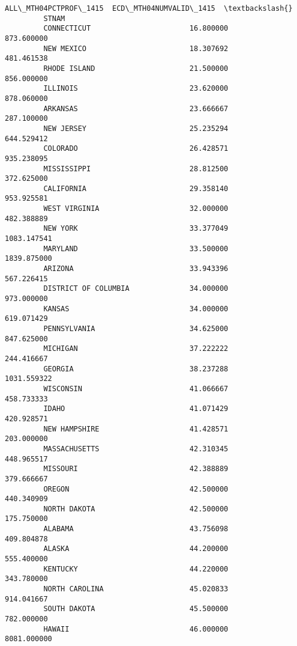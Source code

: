 \documentclass[11pt]{article}
\begin{document}
\begin{Verbatim}[commandchars=\\\{\}]
                               ALL\_MTH04PCTPROF\_1415  ECD\_MTH04NUMVALID\_1415  \textbackslash{}
         STNAM                                                                 
         CONNECTICUT                       16.800000              873.600000   
         NEW MEXICO                        18.307692              481.461538   
         RHODE ISLAND                      21.500000              856.000000   
         ILLINOIS                          23.620000              878.060000   
         ARKANSAS                          23.666667              287.100000   
         NEW JERSEY                        25.235294              644.529412   
         COLORADO                          26.428571              935.238095   
         MISSISSIPPI                       28.812500              372.625000   
         CALIFORNIA                        29.358140              953.925581   
         WEST VIRGINIA                     32.000000              482.388889   
         NEW YORK                          33.377049             1083.147541   
         MARYLAND                          33.500000             1839.875000   
         ARIZONA                           33.943396              567.226415   
         DISTRICT OF COLUMBIA              34.000000              973.000000   
         KANSAS                            34.000000              619.071429   
         PENNSYLVANIA                      34.625000              847.625000   
         MICHIGAN                          37.222222              244.416667   
         GEORGIA                           38.237288             1031.559322   
         WISCONSIN                         41.066667              458.733333   
         IDAHO                             41.071429              420.928571   
         NEW HAMPSHIRE                     41.428571              203.000000   
         MASSACHUSETTS                     42.310345              448.965517   
         MISSOURI                          42.388889              379.666667   
         OREGON                            42.500000              440.340909   
         NORTH DAKOTA                      42.500000              175.750000   
         ALABAMA                           43.756098              409.804878   
         ALASKA                            44.200000              555.400000   
         KENTUCKY                          44.220000              343.780000   
         NORTH CAROLINA                    45.020833              914.041667   
         SOUTH DAKOTA                      45.500000              782.000000   
         HAWAII                            46.000000             8081.000000   

\end{Verbatim}
\end{document}
